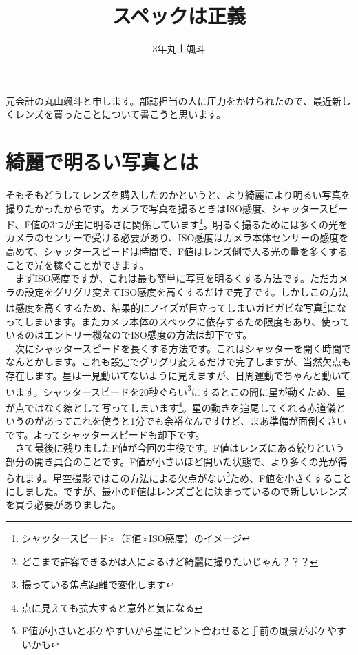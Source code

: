 \documentclass[a4paper.10pt]{jarticle}
\begin{document}
\title{スペックは正義}
\author{3年丸山颯斗}
\date{}
\maketitle

元会計の丸山颯斗と申します。部誌担当の人に圧力をかけられたので、最近新しくレンズを買ったことについて書こうと思います。\\
\section{綺麗で明るい写真とは}
そもそもどうしてレンズを購入したのかというと、より綺麗により明るい写真を撮りたかったからです。カメラで写真を撮るときはISO感度、シャッタースピード、F値の3つが主に明るさに関係しています\footnote{シャッタースピード×（F値×ISO感度）のイメージ}。明るく撮るためには多くの光をカメラのセンサーで受ける必要があり、ISO感度はカメラ本体センサーの感度を高めて、シャッタースピードは時間で、F値はレンズ側で入る光の量を多くすることで光を稼ぐことができます。\\
　まずISO感度ですが、これは最も簡単に写真を明るくする方法です。ただカメラの設定をグリグリ変えてISO感度を高くするだけで完了です。しかしこの方法は感度を高くするため、結果的にノイズが目立ってしまいガビガビな写真\footnote{どこまで許容できるかは人によるけど綺麗に撮りたいじゃん？？？}になってしまいます。またカメラ本体のスペックに依存するため限度もあり、使っているのはエントリー機なのでISO感度の方法は却下です。\\
　次にシャッタースピードを長くする方法です。これはシャッターを開く時間でなんとかします。これも設定でグリグリ変えるだけで完了しますが、当然欠点も存在します。星は一見動いてないように見えますが、日周運動でちゃんと動いています。シャッタースピードを20秒ぐらい\footnote{撮っている焦点距離で変化します}にするとこの間に星が動くため、星が点ではなく線として写ってしまいます\footnote{点に見えても拡大すると意外と気になる}。星の動きを追尾してくれる赤道儀というのがあってこれを使うと1分でも余裕なんですけど、まあ準備が面倒くさいです。よってシャッタースピードも却下です。\\
　さて最後に残りましたF値が今回の主役です。F値はレンズにある絞りという部分の開き具合のことです。F値が小さいほど開いた状態で、より多くの光が得られます。星空撮影ではこの方法による欠点がない\footnote{F値が小さいとボケやすいから星にピント合わせると手前の風景がボケやすいかも}ため、F値を小さくすることにしました。ですが、最小のF値はレンズごとに決まっているので新しいレンズを買う必要がありました。
\end{document}
